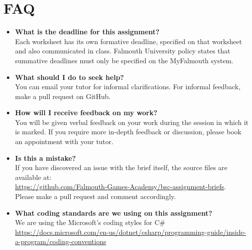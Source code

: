 \documentclass{../../fal_assignment}
\begin{document}
	\section*{FAQ}
	
	\begin{itemize}
		\item 	\textbf{What is the deadline for this assignment?} \\ 
		Each worksheet has its own formative deadline, specified on that worksheet and also communicated in class.
		Falmouth University policy states that summative deadlines must only be specified on the MyFalmouth system.
		
		\item 	\textbf{What should I do to seek help?} \\ 
		You can email your tutor for informal clarifications. For informal feedback, make a pull request on GitHub. 
		
		\item 	\textbf{How will I receive feedback on my work?} \\ 
		You will be given verbal feedback on your work during the session in which it is marked.
		If you require more in-depth feedback or discussion, please book an appointment with your tutor.
		
		\item 	\textbf{Is this a mistake?} \\ 	
		If you have discovered an issue with the brief itself, the source files are available at: \\
		\url{https://github.com/Falmouth-Games-Academy/bsc-assignment-briefs}.\\
		Please make a pull request and comment accordingly.
		
		\item \textbf{What coding standards are we using on this assignment?}\\
		We are using the Microsoft's coding styles for C\# \\
		\url{https://docs.microsoft.com/en-us/dotnet/csharp/programming-guide/inside-a-program/coding-conventions}
	\end{itemize}
	
\end{document}
